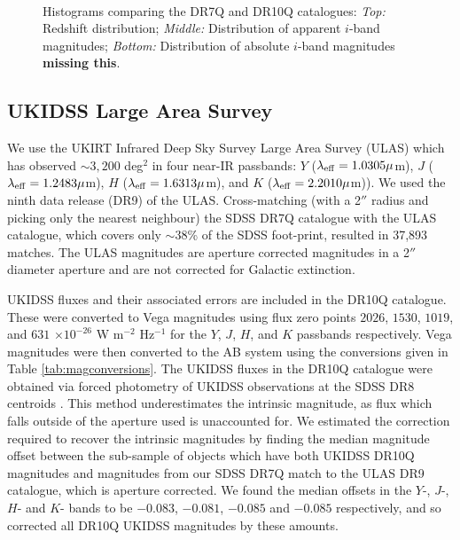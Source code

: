 \begin{figure}
\begin{minipage}[b]{0.5\textwidth}
  \end{minipage}\\ 
  \caption{Histograms comparing the DR7Q and DR10Q catalogues: {\it Top:} Redshift distribution; {\it Middle:} Distribution of apparent $i$-band magnitudes; {\it Bottom:} Distribution of absolute $i$-band magnitudes {\bf missing this}.} 
  \label{fig:histograms}
\end{figure}

\subsection{UKIDSS Large Area Survey}

We use the UKIRT Infrared Deep Sky Survey \citep[UKIDSS;][]{lawrence07} Large Area Survey (ULAS) which has observed $\sim 3,200$ deg$^2$ in four near-IR passbands: $Y$ ($\lambda_{\rm eff} = 1.0305\mu$m), $J$ ($\lambda_{\rm eff} = 1.2483\mu$m), $H$ ($\lambda_{\rm eff} = 1.6313\mu$m), and $K$ ($\lambda_{\rm eff} = 2.2010\mu$m)). We used the ninth data release (DR9) of the ULAS. Cross-matching (with a 2$''$ radius and picking only the nearest neighbour) the SDSS DR7Q catalogue with the ULAS catalogue, which covers only $\sim 38$\% of the SDSS foot-print, resulted in 37,893 matches. The ULAS magnitudes are aperture corrected magnitudes in a 2$''$ diameter aperture and are not corrected for Galactic extinction.

UKIDSS fluxes and their associated errors are included in the DR10Q catalogue. These were converted to Vega magnitudes using flux zero points $2026$, $1530$, $1019$, and $631$ $\times10^{-26}$ W m$^{-2}$ Hz$^{-1}$ for the $Y$, $J$, $H$, and $K$ passbands respectively. Vega magnitudes were then converted to the AB system using the conversions given in Table \ref{tab:magconversions}. The UKIDSS fluxes in the DR10Q catalogue were obtained via forced photometry of UKIDSS observations at the SDSS DR8 centroids \citep{aihara11}. This method underestimates the intrinsic magnitude, as flux which falls outside of the aperture used is unaccounted for. We estimated the correction required to recover the intrinsic magnitudes by finding the median magnitude offset between the sub-sample of objects which have both UKIDSS DR10Q magnitudes and magnitudes from our SDSS DR7Q match to the ULAS DR9 catalogue, which is aperture corrected. We found the median offsets in the $Y$-, $J$-, $H$- and $K$- bands to be $-0.083$, $-0.081$, $-0.085$ and $-0.085$ respectively, and so corrected all DR10Q UKIDSS magnitudes by these amounts. 

